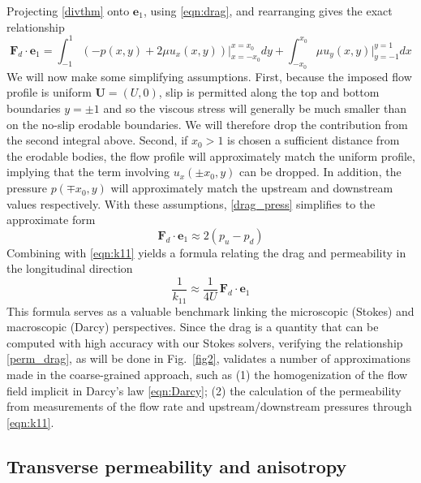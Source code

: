 \documentclass[3p]{elsarticle}
\newcommand{\UU}{{\mathbf{U}}}
\newcommand{\bvec}[1]{\mathbf{#1}}
\newcommand{\pup}{p_u}
\newcommand{\pdn}{p_d}
\newcommand{\FD}{\bvec{F}_d}
\newcommand{\ex}{ {\bvec{e}}_1}
\begin{document}
Projecting \eqref{divthm} onto $\ex$, using \eqref{eqn:drag}, and rearranging gives the exact relationship
\begin{equation}
\label{drag_press}
\FD \cdot \ex = \int_{-1}^{1} \left( -p(x,y) + 2 \mu u_x(x,y) \right) \big|_{x=-x_0}^{x=x_0} dy + 
\int_{-x_0}^{x_0} \mu u_y(x,y) \big|_{y=-1}^{y=1} dx
\end{equation}
We will now make some simplifying assumptions. First, because the imposed flow profile is uniform $\UU = (U,0)$, slip is permitted along the top and bottom boundaries $y=\pm 1$ and so the viscous stress will generally be much smaller than on the no-slip erodable boundaries. We will therefore drop the contribution from the second integral above. Second, if $x_0 > 1$ is chosen a sufficient distance from the erodable bodies, the flow profile will approximately match the uniform profile, implying that the term involving $u_x(\pm x_0, y)$ can be dropped. In addition, the pressure $p(\mp x_0, y)$ will approximately match the upstream and downstream values respectively. With these assumptions, \eqref{drag_press} simplifies to the approximate form
\begin{equation}
\FD \cdot \ex \approx 2 (\pup - \pdn)
\end{equation}
Combining with \eqref{eqn:k11} yields a formula relating the drag and permeability in the longitudinal direction
\begin{equation}
\label{perm_drag}
\frac{1}{k_{11}} \approx \frac{1}{4 U}  \, \FD \cdot \ex
\end{equation}
This formula serves as a valuable benchmark linking the microscopic (Stokes) and macroscopic (Darcy) perspectives. Since the drag is a quantity that can be computed with high accuracy with our Stokes solvers, verifying the relationship \eqref{perm_drag}, as will be done in Fig.~\ref{fig2}, validates a number of approximations made in the coarse-grained approach, such as (1) the homogenization of the flow field implicit in Darcy's law \eqref{eqn:Darcy}; (2) the calculation of the permeability from measurements of the flow rate and upstream/downstream pressures through \eqref{eqn:k11}.

\subsection{Transverse permeability and anisotropy}
\end{document}

